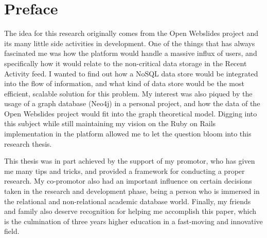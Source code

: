 
\chapter*{Preface}
\label{ch:preface}


The idea for this research originally comes from the Open Webslides project and its many little side activities in development.
One of the things that has always fascinated me was how the platform would handle a massive influx of users, and specifically how it would relate to the non-critical data storage in the Recent Activity feed.
I wanted to find out how a NoSQL data store would be integrated into the flow of information, and what kind of data store would be the most efficient, scalable solution for this problem.
My interest was also piqued by the usage of a graph database (Neo4j) in a personal project, and how the data of the Open Webslides project would fit into the graph theoretical model.
Digging into this subject while still maintaining my vision on the Ruby on Rails implementation in the platform allowed me to let the question bloom into this research thesis.

This thesis was in part achieved by the support of my promotor, who has given me many tips and tricks, and provided a framework for conducting a proper research.
My co-promotor also had an important influence on certain decisions taken in the research and development phase, being a person who is immersed in the relational and non-relational academic database world.
Finally, my friends and family also deserve recognition for helping me accomplish this paper, which is the culmination of three years higher education in a fast-moving and innovative field.
